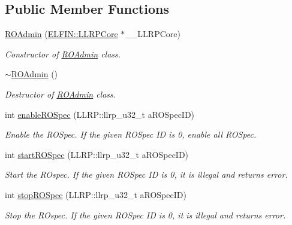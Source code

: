 \subsection*{Public Member Functions}
\begin{DoxyCompactItemize}
\item 
\hyperlink{class_e_l_f_i_n_1_1_r_o_admin_ac0fb2f7c1644c1226196447d77cb3d83}{R\-O\-Admin} (\hyperlink{class_e_l_f_i_n_1_1_l_l_r_p_core}{E\-L\-F\-I\-N\-::\-L\-L\-R\-P\-Core} $\ast$\-\_\-\-\_\-\-L\-L\-R\-P\-Core)
\begin{DoxyCompactList}\small\item\em Constructor of \hyperlink{class_e_l_f_i_n_1_1_r_o_admin}{R\-O\-Admin} class. \end{DoxyCompactList}\item 
\hyperlink{class_e_l_f_i_n_1_1_r_o_admin_a550d5a80aa1489e41b1dc4fe05679f99}{$\sim$\-R\-O\-Admin} ()
\begin{DoxyCompactList}\small\item\em Destructor of \hyperlink{class_e_l_f_i_n_1_1_r_o_admin}{R\-O\-Admin} class. \end{DoxyCompactList}\item 
int \hyperlink{class_e_l_f_i_n_1_1_r_o_admin_adbc39593d539c82db724d351cf042fd4}{enable\-R\-O\-Spec} (L\-L\-R\-P\-::llrp\-\_\-u32\-\_\-t a\-R\-O\-Spec\-I\-D)
\begin{DoxyCompactList}\small\item\em Enable the R\-O\-Spec. If the given R\-O\-Spec I\-D is 0, enable all R\-O\-Spec. \end{DoxyCompactList}\item 
int \hyperlink{class_e_l_f_i_n_1_1_r_o_admin_a6ca27b5b624ecbcc000368e7d31b8363}{start\-R\-O\-Spec} (L\-L\-R\-P\-::llrp\-\_\-u32\-\_\-t a\-R\-O\-Spec\-I\-D)
\begin{DoxyCompactList}\small\item\em Start the R\-Ospec. If the given R\-O\-Spec I\-D is 0, it is illegal and returns error. \end{DoxyCompactList}\item 
int \hyperlink{class_e_l_f_i_n_1_1_r_o_admin_ab998bfdbdd0564ca0aaf044781f58456}{stop\-R\-O\-Spec} (L\-L\-R\-P\-::llrp\-\_\-u32\-\_\-t a\-R\-O\-Spec\-I\-D)
\begin{DoxyCompactList}\small\item\em Stop the R\-Ospec. If the given R\-O\-Spec I\-D is 0, it is illegal and returns error. \end{DoxyCompactList}\item 

\end{DoxyCompactItemize}
